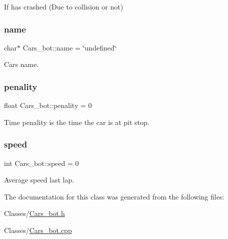 If has crashed (Due to collision or not) 

\mbox{\label{class_cars__bot_af68fbb76d9a894060bc33b9837d50796}} 
\subsubsection{\texorpdfstring{name}{name}}
{\footnotesize\ttfamily char$\ast$ Cars\+\_\+bot\+::name = \char`\"{}undefined\char`\"{}}



Car\textquotesingle{}s name. 

\mbox{\label{class_cars__bot_a61c7db007ee9ea521ba5369ab7d76e1e}} 
\subsubsection{\texorpdfstring{penality}{penality}}
{\footnotesize\ttfamily float Cars\+\_\+bot\+::penality = 0}



Time penality is the time the car is at pit stop. 

\mbox{\label{class_cars__bot_aa1c5f72aa6b013435bab77408fd56388}} 
\subsubsection{\texorpdfstring{speed}{speed}}
{\footnotesize\ttfamily int Cars\+\_\+bot\+::speed = 0}



Average speed last lap. 



The documentation for this class was generated from the following files\+:\begin{DoxyCompactItemize}
\item 
Classes/\hyperlink{_cars__bot_8h}{Cars\+\_\+bot.\+h}\item 
Classes/\hyperlink{_cars__bot_8cpp}{Cars\+\_\+bot.\+cpp}\end{DoxyCompactItemize}
